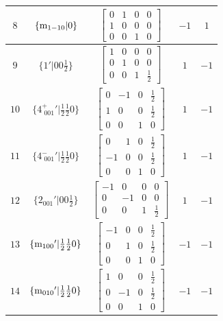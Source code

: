 \documentclass[fleqn,8pt]{jsarticle}
\begin{document}
\begin{longtable}{ccccc}
$ 8 $ & $ \{{\rm m}_{1-10}|0\} $ & $ \begin{bmatrix} 0 & 1 & 0 & 0 \\ 1 & 0 & 0 & 0 \\ 0 & 0 & 1 & 0 \end{bmatrix} $ & $ -1 $ & $ 1 $ \\ \hline
$ 9 $ & $ \{1{}'|0 0 \frac{1}{2}\} $ & $ \begin{bmatrix} 1 & 0 & 0 & 0 \\ 0 & 1 & 0 & 0 \\ 0 & 0 & 1 & \frac{1}{2} \end{bmatrix} $ & $ 1 $ & $ -1 $ \\ \hline
$ 10 $ & $ \{4^{+}_{\,\,001}{}'|\frac{1}{2} \frac{1}{2} 0\} $ & $ \begin{bmatrix} 0 & -1 & 0 & \frac{1}{2} \\ 1 & 0 & 0 & \frac{1}{2} \\ 0 & 0 & 1 & 0 \end{bmatrix} $ & $ 1 $ & $ -1 $ \\ \hline
$ 11 $ & $ \{4^{-}_{\,\,001}{}'|\frac{1}{2} \frac{1}{2} 0\} $ & $ \begin{bmatrix} 0 & 1 & 0 & \frac{1}{2} \\ -1 & 0 & 0 & \frac{1}{2} \\ 0 & 0 & 1 & 0 \end{bmatrix} $ & $ 1 $ & $ -1 $ \\ \hline
$ 12 $ & $ \{2{}_{001}{}'|0 0 \frac{1}{2}\} $ & $ \begin{bmatrix} -1 & 0 & 0 & 0 \\ 0 & -1 & 0 & 0 \\ 0 & 0 & 1 & \frac{1}{2} \end{bmatrix} $ & $ 1 $ & $ -1 $ \\ \hline
$ 13 $ & $ \{{\rm m}_{100}{}'|\frac{1}{2} \frac{1}{2} 0\} $ & $ \begin{bmatrix} -1 & 0 & 0 & \frac{1}{2} \\ 0 & 1 & 0 & \frac{1}{2} \\ 0 & 0 & 1 & 0 \end{bmatrix} $ & $ -1 $ & $ -1 $ \\ \hline
$ 14 $ & $ \{{\rm m}_{010}{}'|\frac{1}{2} \frac{1}{2} 0\} $ & $ \begin{bmatrix} 1 & 0 & 0 & \frac{1}{2} \\ 0 & -1 & 0 & \frac{1}{2} \\ 0 & 0 & 1 & 0 \end{bmatrix} $ & $ -1 $ & $ -1 $ \\ \hline

\end{longtable}
\end{document}
